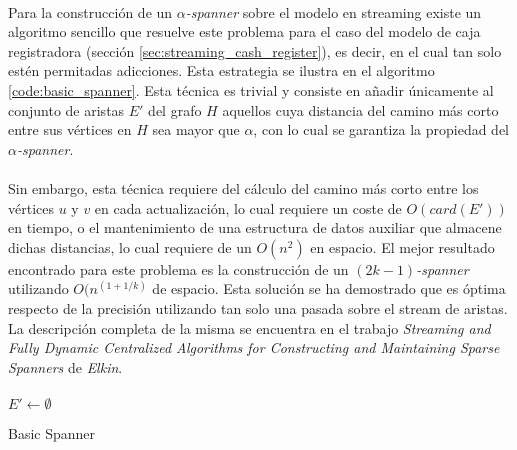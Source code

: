 \documentclass{subfiles}
\begin{document}
        \paragraph{}
        Para la construcción de un \emph{$\alpha$-spanner} sobre el modelo en streaming existe un algoritmo sencillo que resuelve este problema para el caso del modelo de caja registradora (sección \ref{sec:streaming_cash_register}), es decir, en el cual tan solo estén permitadas adicciones. Esta estrategia se ilustra en el algoritmo \ref{code:basic_spanner}. Esta técnica es trivial y consiste en añadir únicamente al conjunto de aristas $E'$ del grafo $H$ aquellos cuya distancia del camino más corto entre sus vértices en $H$ sea mayor que $\alpha$, con lo cual se garantiza la propiedad del \emph{$\alpha$-spanner}.

        \paragraph{}
        Sin embargo, esta técnica requiere del cálculo del camino más corto entre los vértices $u$ y $v$ en cada actualización, lo cual requiere un coste de $O(card(E'))$ en tiempo, o el mantenimiento de una estructura de datos auxiliar que almacene dichas distancias, lo cual requiere de un $O(n^2)$ en espacio. El mejor resultado encontrado para este problema es la construcción de un \emph{$(2k-1)$-spanner} utilizando $O(n^(1+1/k)$ de espacio. Esta solución se ha demostrado que es óptima respecto de la precisión utilizando tan solo una pasada sobre el stream de aristas. La descripción completa de la misma se encuentra en el trabajo \emph{Streaming and Fully Dynamic Centralized Algorithms for Constructing and Maintaining Sparse Spanners} \cite{elkin2007streaming} de \emph{Elkin}.

        \paragraph{}
        \begin{algorithm}
          \SetAlgoLined
          $E' \gets \emptyset$\;
          \caption{Basic Spanner}
          \label{code:basic_spanner}
        \end{algorithm}
\end{document}
